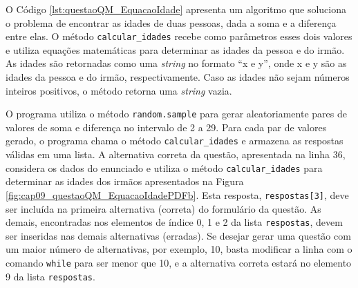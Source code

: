 O Código \ref{lst:questaoQM_EquacaoIdade} apresenta um algoritmo que soluciona o problema de encontrar as idades de duas pessoas, dada a soma e a diferença entre elas. O método \verb|calcular_idades| recebe como parâmetros esses dois valores e utiliza equações matemáticas para determinar as idades da pessoa e do irmão. As idades são retornadas como uma \textit{string} no formato ``x e y'', onde x e y são as idades da pessoa e do irmão, respectivamente. Caso as idades não sejam números inteiros positivos, o método retorna uma \textit{string} vazia.

O programa utiliza o método \verb|random.sample| para gerar aleatoriamente pares de valores de soma e diferença no intervalo de 2 a 29. Para cada par de valores gerado, o programa chama o método \verb|calcular_idades| e armazena as respostas válidas em uma lista. A alternativa correta da questão, apresentada na linha 36, considera os dados do enunciado e utiliza o método \verb|calcular_idades| para determinar as idades dos irmãos apresentados na Figura \ref{fig:cap09_questaoQM_EquacaoIdadePDFb}. Esta resposta, \verb|respostas[3]|, deve ser incluída na primeira alternativa (correta) do formulário da questão. As demais, encontradas nos elementos de índice 0, 1 e 2 da lista \verb|respostas|, devem ser inseridas nas demais alternativas (erradas). Se desejar gerar uma questão com um maior número de alternativas, por exemplo, 10, basta modificar a linha com o comando \verb|while| para ser menor que 10, e a alternativa correta estará no elemento 9 da lista \verb|respostas|.

